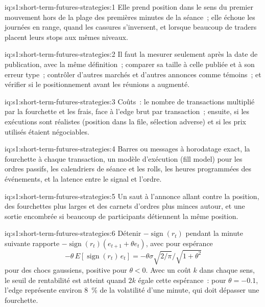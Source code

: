 \begin{solution}{iq:s1:short-term-futures-strategies:1}
Elle prend position dans le sens du premier mouvement hors de la plage des premières minutes de la séance~; elle échoue les journées en range, quand les cassures s'inversent,
et lorsque beaucoup de traders placent leurs stops aux mêmes niveaux.
\end{solution}

\begin{solution}{iq:s1:short-term-futures-strategies:2}
Il faut la mesurer seulement après la date de publication, avec la même définition~; comparer sa taille à celle publiée et à son erreur type~; contrôler
d'autres marchés et d'autres annonces comme témoins~; et vérifier si le positionnement avant les réunions a augmenté.
\end{solution}

\begin{solution}{iq:s1:short-term-futures-strategies:3}
Coûts~: le nombre de transactions multiplié par la fourchette et les frais, face à l'edge brut par transaction~; ensuite, si les exécutions sont réalistes (position dans la file, sélection
adverse) et si les prix utilisés étaient négociables.
\end{solution}

\begin{solution}{iq:s1:short-term-futures-strategies:4}
Barres ou messages à horodatage exact, la fourchette à chaque transaction, un modèle d'exécution (fill model) pour les ordres passifs, les calendriers de séance et les rolls, les heures programmées des événements,
et la latence entre le signal et l'ordre.
\end{solution}

\begin{solution}{iq:s1:short-term-futures-strategies:5}
Un saut à l'annonce allant contre la position, des fourchettes plus larges et des carnets d'ordres plus minces autour, et une sortie encombrée si beaucoup de participants détiennent la même position.
\end{solution}

\begin{solution}{iq:s1:short-term-futures-strategies:6}
Détenir $-\operatorname{sign}(r_t)$ pendant la minute suivante rapporte $-\operatorname{sign}(r_t)(e_{t+1} + \theta e_t)$, avec pour espérance
\[
-\theta\,E[\operatorname{sign}(r_t)\,e_t] = -\theta\sigma\sqrt{2/\pi}\big/\sqrt{1 + \theta^2}
\]
pour des chocs gaussiens, positive pour $\theta < 0$. Avec un coût $k$ dans chaque sens, le seuil de rentabilité est atteint quand $2k$ égale cette espérance~: pour
$\theta = -0.1$, l'edge représente environ 8~\% de la volatilité d'une minute, qui doit dépasser une fourchette.
\end{solution}
